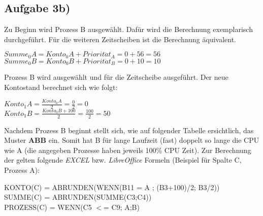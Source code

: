 \documentclass{ti2}
\begin{document}
\subsection*{Aufgabe 3b)}
Zu Beginn wird Prozess B ausgewählt. Dafür wird die Berechnung exemplarisch durchgeführt. Für die weiteren Zeitscheiben ist die Berechnung äquivalent.
\begin{center}
$Summe_0A = Konto_0A + Priorit\ddot{a}t_A = 0 + 56 = 56$\\
$Summe_0B = Konto_0B + Priorit\ddot{a}t_B = 0 + 10 = 10$\\
\end{center}
Prozess B wird ausgewählt und für die Zeitscheibe ausgeführt. Der neue Kontostand berechnet sich wie folgt: 
\begin{center}
$Konto_1A = \frac{Konto_0A}{2} = \frac{0}{2} = 0$\\ 
$Konto_1B = \frac{Konto_0B+100}{2} = \frac{100}{2} = 50$\\
\end{center}
Nachdem Prozess B beginnt stellt sich, wie auf folgender Tabelle ersichtlich, das Muster \textbf{ABB} ein. Somit hat B für lange Laufzeit (fast) doppelt so lange die CPU wie A (die angegeben Prozesse haben jeweils 100\% CPU Zeit). Zur Berechnung der gelten folgende \textit{EXCEL} bzw. \textit{LibreOffice} Formeln (Beispiel für Spalte C, Prozess A):
\begin{center}
KONTO(C) = ABRUNDEN(WENN(B11 = \glqq A \grqq; (B3+100)/2; B3/2)) \\
SUMME(C) = ABRUNDEN(SUMME(C3;C4))\\
PROZESS(C) = WENN(C5 $<$= C9; \glqq A\grqq;\glqq B\grqq)
\end{center}
\end{document}
